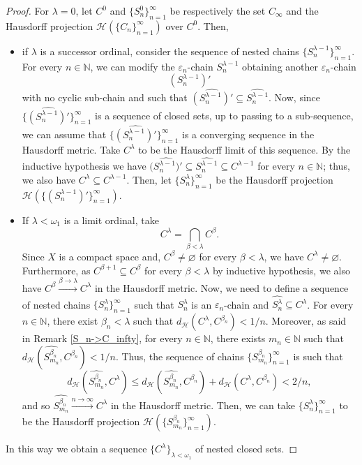 \documentclass[10pt,a4paper]{article}
\theoremstyle{definition}
\theoremstyle{remark}
\theoremstyle{plain}
\begin{document}
\begin{proof}
    For $\lambda=0$, let $C^0$ and $\{S^0_n\}_{n=1}^{\infty}$ be respectively the set $C_\infty$ and the Hausdorff projection $\mathcal{H}(\{C_n\}_{n=1}^{\infty})$ over $C^0$. Then,
    \begin{itemize} 
        \item if $\lambda$ is a successor ordinal, consider the sequence of nested chains $\{S^{\lambda-1}_{n}\}_{n=1}^{\infty}$. For every $n\in\mathbb{N}$, we can modify the $\varepsilon_n$-chain $S^{\lambda-1}_n$ obtaining another $\varepsilon_n$-chain 
        \begin{equation}\label{acyclic_chain}
            ({S^{\lambda-1}_n})'
        \end{equation}
       with no cyclic sub-chain and such that $\widehat{({S^{\lambda-1}_n})'}\subseteq\widehat{S^{\lambda-1}_n}$. Now, since $\{\widehat{({S^{\lambda-1}_n})'}\}_{n=1}^{\infty}$ is a sequence of closed sets, up to passing to a sub-sequence, we can assume that $\{\widehat{({S^{\lambda-1}_n})'}\}_{n=1}^\infty$ is a converging sequence in the Hausdorff metric. Take $C^\lambda$ to be the Hausdorff limit of this sequence. By the inductive hypothesis we have $\widehat{{(S^{\lambda-1}_n})'}\subseteq\widehat{S^{\lambda-1}_n}\subseteq C^{\lambda-1}$ for every $n\in\mathbb{N}$; thus, we also have $C^\lambda\subseteq C^{\lambda-1}$. Then, let $\{S^\lambda_n\}_{n=1}^{\infty}$ be the Hausdorff projection $\mathcal{H}(\{({S^{\lambda-1}_n})'\}_{n=1}^{\infty})$.
        \item If $\lambda<\omega_1$ is a limit ordinal, take
        $$C^\lambda=\bigcap_{\beta<\lambda}C^\beta.$$
        Since $X$ is a compact space and,  $C^\beta\neq\varnothing$ for every $\beta<\lambda$, we have $C^\lambda\neq\varnothing$. Furthermore, as $C^{\beta+1}\subseteq C^\beta$ for every $\beta<\lambda$ by inductive hypothesis, we also have $C^\beta\xrightarrow{\beta\to\lambda}C^\lambda$ in the Hausdorff metric.
        Now, we need to define a sequence of nested chains $\{S^\lambda_n\}_{n=1}^{\infty}$ such that $S^\lambda_n$ is an $\varepsilon_n$-chain and $\widehat{S^\lambda_n}\subseteq C^\lambda$. For every $n\in\mathbb{N}$, there exist $\beta_n<\lambda$ such that $d_\mathcal{H}(C^\lambda,C^{\beta_n})<1/n$. Moreover, as said in Remark \ref{S_n->C_infty}, for every $n\in\mathbb{N}$, there exists $m_n\in\mathbb{N}$ such that $d_\mathcal{H}(\widehat{S^{\beta_n}_{m_n}},C^{\beta_n})<1/n$. Thus, the sequence of chains $\{S^{\beta_n}_{m_n}\}_{n=1}^{\infty}$ is such that
        $$d_\mathcal{H}(\widehat{S^{\beta_n}_{m_n}},C^\lambda)\le d_\mathcal{H}(\widehat{S^{\beta_n}_{m_n}},C^{\beta_n})+d_\mathcal{H}(C^\lambda,C^{\beta_n})<2/n,$$
        and so $\widehat{S^{\beta_n}_{m_n}}\xrightarrow{n\to\infty}C^\lambda$ in the Hausdorff metric. Then, we can take $\{S^\lambda_n\}_{n=1}^{\infty}$ to be the Hausdorff projection $\mathcal{H}(\{S^{\beta_n}_{m_n}\}_{n=1}^{\infty})$.
    \end{itemize}
    In this way we obtain a sequence $\{C^\lambda\}_{\lambda<\omega_1}$ of nested closed sets. 
    

\end{proof}
\end{document}
